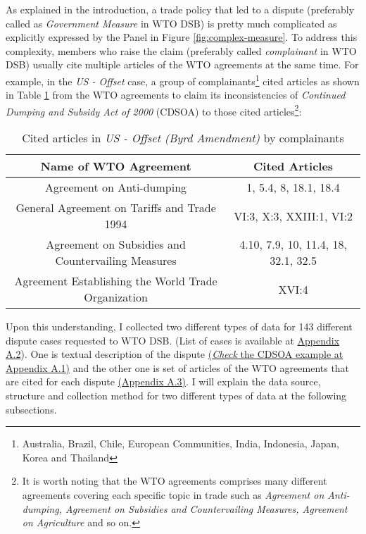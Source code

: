 As explained in the introduction,
a trade policy that led to a dispute (preferably called as \textit{Government Measure} in WTO DSB) is pretty much complicated as explicitly expressed by the Panel in Figure \ref{fig:complex-measure}.
To address this complexity,
members who raise the claim (preferably called \textit{complainant} in WTO DSB) usually cite multiple articles of the WTO agreements at the same time. For example, in the
\textit{US - Offset} case,
a group of complainants\footnote{Australia,
   Brazil,
   Chile,
   European Communities,
   India,
   Indonesia,
   Japan,
   Korea and Thailand}
cited articles as shown in Table \ref{xltabular:cited-article-for-us-offset} from the WTO agreements to claim its inconsistencies of \textit{Continued Dumping and Subsidy Act of 2000} (CDSOA) to those cited articles\footnote{It is worth noting that the WTO agreements comprises many different agreements covering each specific topic in trade such as \textit{Agreement on Anti-dumping, Agreement on Subsidies and Countervailing Measures, Agreement on Agriculture} and so on.}:
\\
\begin{table}[h]
   \setlength\tabcolsep{15pt}
   \begin{tabular}{ c | c }
       \hline
       \textbf{\normalsize Name of WTO Agreement}          & \textbf{\normalsize Cited Articles} \\
       \hline \hline
       Agreement on Anti-dumping                           & 1, 5.4, 8, 18.1, 18.4               \\ \hline
       General Agreement on Tariffs and Trade 1994         & VI:3, X:3, XXIII:1, VI:2            \\ \hline
       Agreement on Subsidies and Countervailing Measures  & 4.10, 7.9, 10, 11.4, 18, 32.1, 32.5 \\ \hline
       Agreement Establishing the World Trade Organization & XVI:4                               \\ \hline
   \end{tabular}
   \caption{Cited articles in \textit{US - Offset (Byrd Amendment)} by complainants}
   \label{xltabular:cited-article-for-us-offset}
\end{table}
 
\noindent Upon this understanding,
I collected two different types of data for 143 different dispute cases requested to WTO DSB. (List of cases is
available at \hyperref[sub:cited-articles-table]{Appendix A.2}).
One is textual description of the dispute \hyperref[sub:factual-aspect-example]{(\textit{Check} the CDSOA example at Appendix A.1)} and the other one is
set of articles of the WTO agreements that are
cited for each dispute \hyperref[sub:cited-articles-table]{(Appendix A.3)}.
I will explain the data source, structure and collection method for two different types of data at the following subsections.\\
 

 
 

